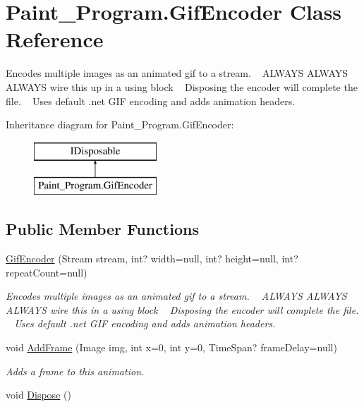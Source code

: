 \hypertarget{class_paint___program_1_1_gif_encoder}{}\section{Paint\+\_\+\+Program.\+Gif\+Encoder Class Reference}
\label{class_paint___program_1_1_gif_encoder}


Encodes multiple images as an animated gif to a stream. ~\newline
 A\+L\+W\+A\+YS A\+L\+W\+A\+YS A\+L\+W\+A\+YS wire this up in a using block ~\newline
 Disposing the encoder will complete the file. ~\newline
 Uses default .net G\+IF encoding and adds animation headers.  


Inheritance diagram for Paint\+\_\+\+Program.\+Gif\+Encoder\+:\begin{figure}[H]
\begin{center}
\leavevmode
\includegraphics[height=2.000000cm]{class_paint___program_1_1_gif_encoder}
\end{center}
\end{figure}
\subsection*{Public Member Functions}
\begin{DoxyCompactItemize}
\item 
\mbox{\hyperlink{class_paint___program_1_1_gif_encoder_aa5dfacef849ac58b11453ced6cb559e2}{Gif\+Encoder}} (Stream stream, int? width=null, int? height=null, int? repeat\+Count=null)
\begin{DoxyCompactList}\small\item\em Encodes multiple images as an animated gif to a stream. ~\newline
 A\+L\+W\+A\+YS A\+L\+W\+A\+YS A\+L\+W\+A\+YS wire this in a using block ~\newline
 Disposing the encoder will complete the file. ~\newline
 Uses default .net G\+IF encoding and adds animation headers. \end{DoxyCompactList}\item 
void \mbox{\hyperlink{class_paint___program_1_1_gif_encoder_aac02f22617e5123c3101795ee3161d7f}{Add\+Frame}} (Image img, int x=0, int y=0, Time\+Span? frame\+Delay=null)
\begin{DoxyCompactList}\small\item\em Adds a frame to this animation. \end{DoxyCompactList}\item 
void \mbox{\hyperlink{class_paint___program_1_1_gif_encoder_a169050e40e9e0736b60337c2f3a4019b}{Dispose}} ()
\end{DoxyCompactItemize}

